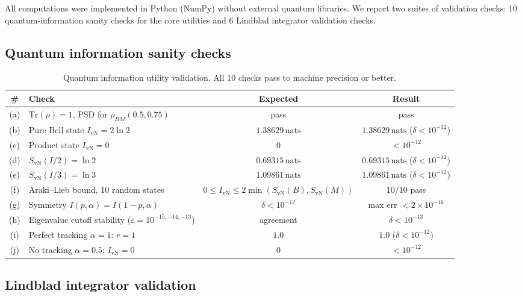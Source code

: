 \documentclass[12pt,a4paper]{article}
\newcommand{\SvN}{S_{\mathrm{vN}}}
\newcommand{\IvN}{I_{\mathrm{vN}}}
\renewcommand{\Tr}{\mathrm{Tr}}
\newcommand{\nats}{\,\mathrm{nats}}
\begin{document}
All computations were implemented in Python (NumPy) without
external quantum libraries.  We report two suites of validation
checks: 10 quantum-information sanity checks for the core utilities
and 6 Lindblad integrator validation checks.

\subsection{Quantum information sanity checks}

\begin{table}[H]
\centering
\small
\begin{tabular}{clcc}
  \toprule
  \# & Check & Expected & Result \\
  \midrule
  (a) & $\Tr(\rho) = 1$, PSD for $\rho_{BM}(0.5, 0.75)$
      & pass & pass \\
  (b) & Pure Bell state $\IvN = 2\ln 2$
      & $1.38629\nats$ & $1.38629\nats$ ($\delta < 10^{-12}$) \\
  (c) & Product state $\IvN = 0$
      & $0$ & $< 10^{-12}$ \\
  (d) & $\SvN(I/2) = \ln 2$
      & $0.69315\nats$ & $0.69315\nats$ ($\delta < 10^{-12}$) \\
  (e) & $\SvN(I/3) = \ln 3$
      & $1.09861\nats$ & $1.09861\nats$ ($\delta < 10^{-12}$) \\
  (f) & Araki--Lieb bound, 10 random states
      & $0 \le \IvN \le 2\min(\SvN(B), \SvN(M))$ & 10/10 pass \\
  (g) & Symmetry $I(p,\alpha) = I(1-p,\alpha)$
      & $\delta < 10^{-12}$ & max err $< 2 \times 10^{-16}$ \\
  (h) & Eigenvalue cutoff stability ($\varepsilon = 10^{-15,-14,-13}$)
      & agreement & $\delta < 10^{-13}$ \\
  (i) & Perfect tracking $\alpha = 1$: $r = 1$
      & $1.0$ & $1.0$ ($\delta < 10^{-12}$) \\
  (j) & No tracking $\alpha = 0.5$: $\IvN = 0$
      & $0$ & $< 10^{-12}$ \\
  \bottomrule
\end{tabular}
\caption{Quantum information utility validation.
All 10 checks pass to machine precision or better.}
\label{tab:qi-checks}
\end{table}

\subsection{Lindblad integrator validation}
\end{document}
